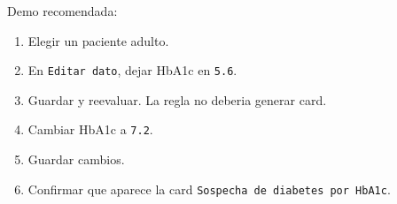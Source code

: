 Demo recomendada:

\begin{enumerate}
  \item Elegir un paciente adulto.
  \item En \texttt{Editar dato}, dejar HbA1c en \texttt{5.6}.
  \item Guardar y reevaluar. La regla no deberia generar card.
  \item Cambiar HbA1c a \texttt{7.2}.
  \item Guardar cambios.
  \item Confirmar que aparece la card \texttt{Sospecha de diabetes por HbA1c}.
\end{enumerate}

